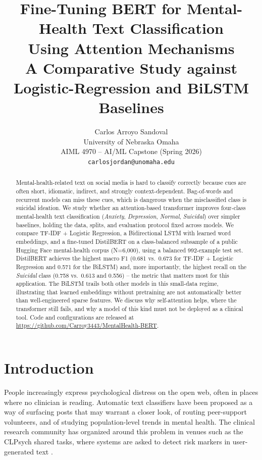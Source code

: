 \documentclass[12pt]{article}
\title{\textbf{Fine-Tuning BERT for Mental-Health Text Classification\\
Using Attention Mechanisms}\\
\large A Comparative Study against Logistic-Regression and BiLSTM Baselines}
\author{Carlos Arroyo Sandoval\\
University of Nebraska Omaha\\
AIML 4970 -- AI/ML Capstone (Spring 2026)\\
\texttt{carlosjordan@unomaha.edu}}
\date{}
\begin{document}
\maketitle

\begin{abstract}
\noindent
Mental-health-related text on social media is hard to classify
correctly because cues are often short, idiomatic, indirect, and
strongly context-dependent. Bag-of-words and recurrent models can
miss these cues, which is dangerous when the misclassified class is
suicidal ideation. We study whether an attention-based transformer
improves four-class mental-health text classification (\textit{Anxiety},
\textit{Depression}, \textit{Normal}, \textit{Suicidal}) over simpler
baselines, holding the data, splits, and evaluation protocol fixed
across models. We compare TF-IDF + Logistic Regression, a Bidirectional
LSTM with learned word embeddings, and a fine-tuned DistilBERT on a
class-balanced subsample of a public Hugging Face mental-health corpus
(N=6{,}000), using a balanced 992-example test set. DistilBERT
achieves the highest macro F1 (0.681 vs.\ 0.673 for TF-IDF +
Logistic Regression and 0.571 for the BiLSTM) and, more importantly,
the highest recall on the \textit{Suicidal} class (0.758 vs.\ 0.613
and 0.556) -- the metric that matters most for this application.
The BiLSTM trails both other models in this small-data regime,
illustrating that learned embeddings without pretraining are not
automatically better than well-engineered sparse features. We discuss
why self-attention helps, where the transformer still fails, and why a
model of this kind must not be deployed as a clinical tool. Code and
configurations are released at
\url{https://github.com/Carroy3443/MentalHealth-BERT}.
\end{abstract}

\section{Introduction}

People increasingly express psychological distress on the open web,
often in places where no clinician is reading. Automatic text
classifiers have been proposed as a way of surfacing posts that may
warrant a closer look, of routing peer-support volunteers, and of
studying population-level trends in mental health. The clinical
research community has organized around this problem in venues such as
the CLPsych shared tasks, where systems are asked to detect risk
markers in user-generated text \cite{coppersmith2015clpsych,
clpsych2024shared}.
\end{document}
